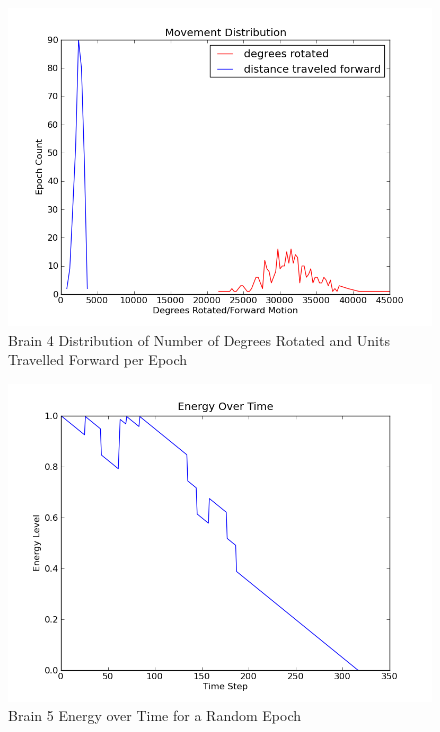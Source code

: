 \documentclass[a4paper,11pt]{article}
\begin{document}
\begin{figure}
\begin{center}
  \includegraphics[scale=1.0]{img/brain4/travelGauss-r5389.65-d916.52.png}
  \caption{Brain 4 Distribution of Number of Degrees Rotated and Units Travelled Forward per Epoch}
  \label{fig:b4travel}
\end{center}
\end{figure}


















\begin{figure}
\begin{center}
  \includegraphics[scale=1.0]{img/brain5/1354471986-5.000000-EvT.png}
  \caption{Brain 5 Energy over Time for a Random Epoch}
  \label{fig:b5evt}
\end{center}
\end{figure}
\end{document}
